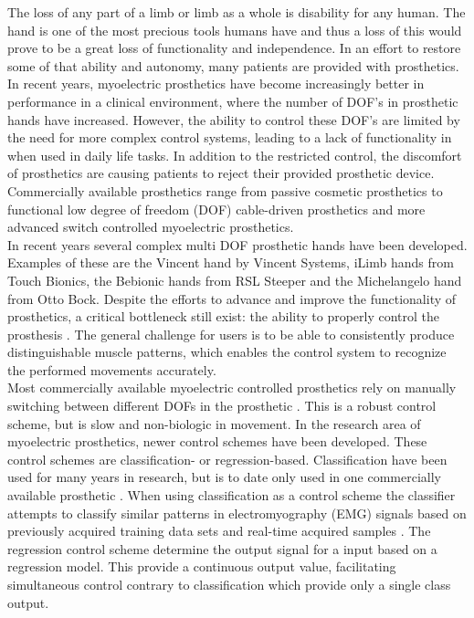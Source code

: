 The loss of any part of a limb or limb as a whole is disability for any human. The hand is one of the most precious tools humans have and thus a loss of this would prove to be a great loss of functionality and independence. In an effort to restore some of that ability and autonomy, many patients are provided with prosthetics. \cite{Peerdeman2011} \\
In recent years, myoelectric prosthetics have become increasingly better in performance in a clinical environment, where the number of DOF’s in prosthetic hands have increased. However, the ability to control these DOF’s are limited by the need for more complex control systems, leading to a lack of functionality in when used in daily life tasks. In addition to the restricted control, the discomfort of prosthetics are causing patients to reject their provided prosthetic device. \cite{Reiber2010} Commercially available prosthetics range from passive cosmetic prosthetics to functional low degree of freedom (DOF) cable-driven prosthetics and more advanced switch controlled myoelectric prosthetics. \\
In recent years several complex multi DOF prosthetic hands have been developed. Examples of these are the Vincent hand by Vincent Systems, iLimb hands from Touch Bionics, the Bebionic hands from RSL Steeper and the Michelangelo hand from Otto Bock. \cite{Belter2013} Despite the efforts to advance and improve the functionality of prosthetics, a critical bottleneck still exist: the ability to properly control the prosthesis \cite{Hwang2017}. The general challenge for users is to be able to consistently produce distinguishable muscle patterns, which enables the control system to recognize the performed movements accurately. \cite{Powell2014} \\
Most commercially available myoelectric controlled prosthetics rely on manually switching between different DOFs in the prosthetic \cite{Fougner2012}. This is a robust control scheme, but is slow and non-biologic in movement. In the research area of myoelectric prosthetics, newer control schemes have been developed. %
These control schemes are classification- or regression-based. Classification have been used for many years in research, but is to date only used in one commercially available prosthetic \cite{Coapt2018}. When using classification as a control scheme the classifier attempts to classify similar patterns in electromyography (EMG) signals based on previously acquired training data sets and real-time acquired samples \cite{Fougner2012, Scheme2015}. The regression control scheme determine the output signal for a input based on a regression model. This provide a continuous output value, facilitating simultaneous control contrary to classification which provide only a single class output. \cite{Hwang2017, Hahne2014} \\
